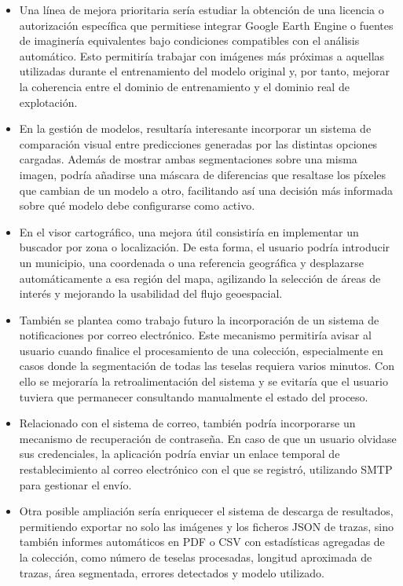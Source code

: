 \begin{itemize}
	\item Una línea de mejora prioritaria sería estudiar la obtención de una licencia o autorización específica que permitiese integrar Google Earth Engine o fuentes de imaginería equivalentes bajo condiciones compatibles con el análisis automático. Esto permitiría trabajar con imágenes más próximas a aquellas utilizadas durante el entrenamiento del modelo original y, por tanto, mejorar la coherencia entre el dominio de entrenamiento y el dominio real de explotación.
	
	\item En la gestión de modelos, resultaría interesante incorporar un sistema de comparación visual entre predicciones generadas por las distintas opciones cargadas. Además de mostrar ambas segmentaciones sobre una misma imagen, podría añadirse una máscara de diferencias que resaltase los píxeles que cambian de un modelo a otro, facilitando así una decisión más informada sobre qué modelo debe configurarse como activo.
	
	\item En el visor cartográfico, una mejora útil consistiría en implementar un buscador por zona o localización. De esta forma, el usuario podría introducir un municipio, una coordenada o una referencia geográfica y desplazarse automáticamente a esa región del mapa, agilizando la selección de áreas de interés y mejorando la usabilidad del flujo geoespacial.
	
	\item También se plantea como trabajo futuro la incorporación de un sistema de notificaciones por correo electrónico. Este mecanismo permitiría avisar al usuario cuando finalice el procesamiento de una colección, especialmente en casos donde la segmentación de todas las teselas requiera varios minutos. Con ello se mejoraría la retroalimentación del sistema y se evitaría que el usuario tuviera que permanecer consultando manualmente el estado del proceso.
	
	\item Relacionado con el sistema de correo, también podría incorporarse un mecanismo de recuperación de contraseña. En caso de que un usuario olvidase sus credenciales, la aplicación podría enviar un enlace temporal de restablecimiento al correo electrónico con el que se registró, utilizando SMTP para gestionar el envío.
	
	\item Otra posible ampliación sería enriquecer el sistema de descarga de resultados, permitiendo exportar no solo las imágenes y los ficheros JSON de trazas, sino también informes automáticos en PDF o CSV con estadísticas agregadas de la colección, como número de teselas procesadas, longitud aproximada de trazas, área segmentada, errores detectados y modelo utilizado.
	

\end{itemize}
